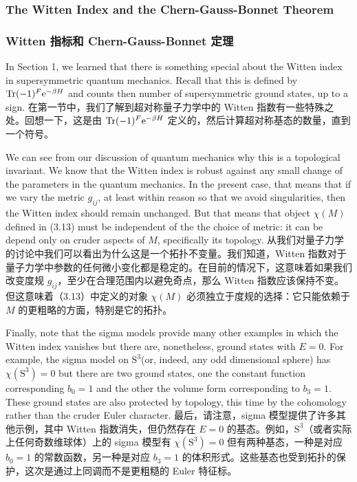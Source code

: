 \documentclass{article}
\newcommand{\rme}{\mathrm{e}}
\begin{document}
\begin{paracol}{2}
\subsubsection{The Witten Index and the Chern-Gauss-Bonnet Theorem}
\switchcolumn
\subsubsection*{Witten 指标和 Chern-Gauss-Bonnet 定理}
\switchcolumn*

In Section 1, we learned that there is something special about the Witten index in supersymmetric quantum mechanics. Recall that this is defined by $\Tr (- 1)^{F} \rme^{- \beta H}$ and counts then number of supersymmetric ground states, up to a sign.
\switchcolumn
在第一节中，我们了解到超对称量子力学中的 Witten 指数有一些特殊之处。回想一下，这是由 $\Tr (- 1)^{F} \rme^{- \beta H}$ 定义的，然后计算超对称基态的数量，直到一个符号。
\switchcolumn*

We can see from our discussion of quantum mechanics why this is a topological invariant. We know that the Witten index is robust against any small change of the parameters in the quantum mechanics. In the present case, that means that if we vary the metric $g_{ij}$, at least within reason so that we avoid singularities, then the Witten index should remain unchanged. But that means that object $\chi(M)$ defined in (3.13) must be independent of the the choice of metric: it can be depend only on cruder aspects of $M$, specifically its topology.
\switchcolumn
从我们对量子力学的讨论中我们可以看出为什么这是一个拓扑不变量。我们知道，Witten 指数对于量子力学中参数的任何微小变化都是稳定的。在目前的情况下，这意味着如果我们改变度规 $g_{ij}$，至少在合理范围内以避免奇点，那么 Witten 指数应该保持不变。但这意味着（3.13）中定义的对象 $\chi(M)$ 必须独立于度规的选择：它只能依赖于 $M$ 的更粗略的方面，特别是它的拓扑。
\switchcolumn*

Finally, note that the sigma models provide many other examples in which the Witten index vanishes but there are, nonetheless, ground states with $E = 0$. For example, the sigma model on $\bm{\mathrm{S}}^3$(or, indeed, any odd dimensional sphere) has $\chi(\bm{\mathrm{S}}^3) = 0$ but there are two ground states, one the constant function corresponding $b_0 = 1$ and the other the volume form corresponding to $b_3 = 1$. These ground states are also protected by topology, this time by the cohomology rather than the cruder Euler character.
\switchcolumn
最后，请注意，sigma 模型提供了许多其他示例，其中 Witten 指数消失，但仍然存在 $E = 0$ 的基态。例如，$\bm{\mathrm{S}}^3$（或者实际上任何奇数维球体）上的 sigma 模型有 $\chi(\bm{\mathrm{S}}^3) = 0$ 但有两种基态，一种是对应 $b_0 = 1$ 的常数函数，另一种是对应 $b_3 = 1$ 的体积形式。这些基态也受到拓扑的保护，这次是通过上同调而不是更粗糙的 Euler 特征标。
\switchcolumn*


\end{paracol}
\end{document}
